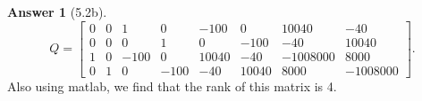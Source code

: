 \documentclass{article}
\theoremstyle{definition}
\newtheorem*{ans}{Answer}
\begin{document}
\begin{ans}[5.2b]

        \begin{equation*}
            Q =     
            \begin{bmatrix}
                0    &      0    &      1    &      0     &  -100    &      0  &    10040  &      -40 \\
                0    &      0    &      0    &      1     &     0    &   -100  &      -40  &    10040 \\
                1    &      0    &   -100    &      0     & 10040    &    -40  & -1008000  &     8000 \\
                0    &      1    &      0    &   -100     &   -40    &  10040  &     8000  & -1008000
            \end{bmatrix}
            .
        \end{equation*}
        Also using matlab, we find that the rank of this matrix is 4.
    \end{ans}
\end{document}
